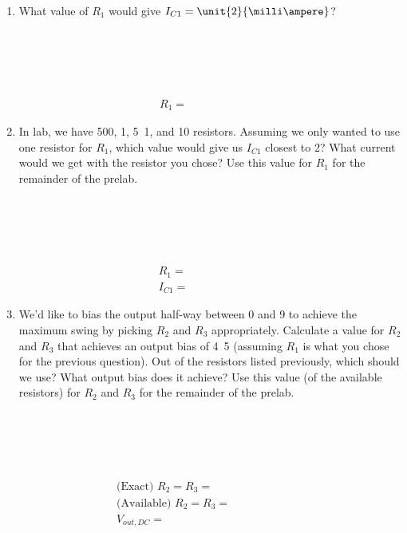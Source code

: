 \documentclass{article}
\begin{document}
\begin{enumerate}

  \item What value of $R_1$ would give $I_{C1}=\unit{2}{\milli\ampere}$? \\~\\~\\~\\~\\~\\
    \begin{align*}
      \boxed{R_1 = ~~~~~~~~~~~~~~~~~~~~~~~~~~~~~~}
    \end{align*}

  \item In lab, we have \unit{500}{\ohm}, \unit{1}{\kilo\ohm}, \unit{5.1}{\kilo\ohm}, and \unit{10}{\kilo\ohm} resistors. Assuming we only wanted to use one resistor for $R_1$, which value would give us $I_{C1}$ closest to \unit{2}{\milli\ampere}? What current would we get with the resistor you chose? Use this value for $R_1$ for the remainder of the prelab. \\~\\~\\~\\~\\~\\
    \begin{align*}
      \boxed{R_1    = ~~~~~~~~~~~~~~~~~~~~~~~~~~~~~~} \\
      \boxed{I_{C1} = ~~~~~~~~~~~~~~~~~~~~~~~~~~~~~~}
    \end{align*}

  \item We'd like to bias the output half-way between \unit{0}{\volt} and \unit{9}{\volt} to achieve the maximum swing by picking $R_2$ and $R_3$ appropriately. Calculate a value for $R_2$ and $R_3$ that achieves an output bias of \unit{4.5}{\volt} (assuming $R_1$ is what you chose for the previous question). Out of the resistors listed previously, which should we use? What output bias does it achieve? Use this value (of the available resistors) for $R_2$ and $R_3$ for the remainder of the prelab. \\~\\~\\~\\~\\~\\
    \begin{align*}
      \text{(Exact) }     \boxed{R_2 = R_3  = ~~~~~~~~~~~~~~~~~~~~~~~~~~~~~~} \\
      \text{(Available) } \boxed{R_2 = R_3  = ~~~~~~~~~~~~~~~~~~~~~~~~~~~~~~} \\
      \boxed{V_{out,DC} = ~~~~~~~~~~~~~~~~~~~~~~~~~~~~~~}
    \end{align*}


\end{enumerate}
\end{document}
